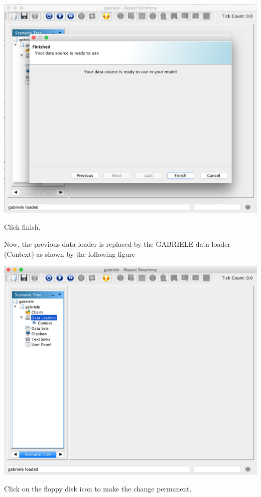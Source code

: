 \documentclass{book}
\begin{document}
\noindent
\includegraphics[scale=0.35]{fig_gabriele_rs_gui5}

Click finish.

Now, the previous data loader is replaced by the GABRIELE data loader (Context) as shown by the following figure

\noindent
\includegraphics[scale=0.35]{fig_gabriele_rs_gui6}

Click on the floppy disk icon to make the change permanent.

\end{document}
